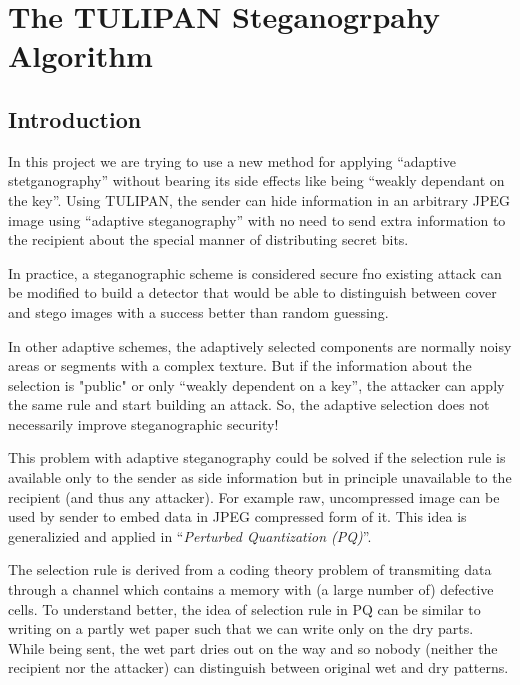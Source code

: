 \chapter{The TULIPAN Steganogrpahy Algorithm}
\begin{flushright}\end{flushright}

\section{Introduction}

In this project we are trying to use a new method for applying ``adaptive stetganography'' without bearing its side effects like 
being ``weakly dependant on the key''. Using TULIPAN, the sender can hide information in an arbitrary JPEG image using ``adaptive steganography'' with no need to send extra information to the recipient about the special manner of distributing secret bits.

﻿In practice, a steganographic scheme is considered secure   fno existing attack can be modified to build a detector that would be
able to distinguish between cover and stego images with a success better than random guessing.

In other adaptive schemes, the adaptively selected components are normally noisy areas or segments with a complex texture. But if the information about the selection is "public" or only “weakly dependent on a key”, the attacker can apply the same rule and start building an attack. So, the adaptive selection does not necessarily improve steganographic security!

This problem with adaptive steganography could be solved if the selection rule is available only to the sender as side information but in principle unavailable to the recipient (and thus any attacker). For example raw, uncompressed image can be used by sender to embed data in JPEG compressed form of it. This idea is generalizied and applied in ``{\it Perturbed Quantization (PQ)}''.

The selection rule is derived from a coding theory problem of transmiting data through a channel which contains a memory with (a large number of) defective cells. To understand better, the idea of selection rule in PQ can be similar to writing on a partly wet paper such that we can write only on the dry parts.  While being sent, the wet part dries out on the way and so nobody (neither the recipient nor the attacker) can distinguish between original wet and dry patterns. 

